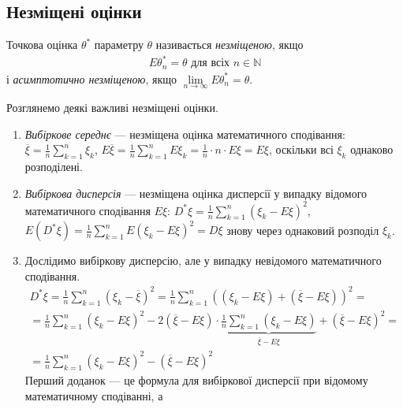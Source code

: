 \subsection{Незміщені оцінки}
 \begin{definition}
    Точкова оцінка $\theta^*$ параметру $\theta$ називається \emph{незміщеною}, якщо
    \begin{gather}\label{estim_unbiased}
        E\theta^*_n = \theta \text{ для всіх } n\in\mathbb{N}
    \end{gather} 
    і \emph{асимптотично незміщеною}, якщо $\underset{n\to\infty}{\lim} E\theta^*_n = \theta$. 
 \end{definition}
 \begin{example} 
    Розглянемо деякі важливі незміщені оцінки.
    \begin{enumerate}
        \item \emph{Вибіркове середнє} --- незміщена оцінка математичного сподівання:
        $\overline{\xi} = \frac{1}{n}\sum\limits_{k=1}^n \xi_k$, $E\overline{\xi} = \frac{1}{n}\sum\limits_{k=1}^n E\xi_k = \frac{1}{n} \cdot{n} \cdot{E\xi} = E\xi$,
        оскільки всі $\xi_k$ однаково розподілені.
        \item \emph{Вибіркова дисперсія} --- незміщена оцінка дисперсії у випадку відомого математичного сподівання $E\xi$:
        $D^*\xi = \frac{1}{n}\sum\limits_{k=1}^n \left(\xi_k - E\xi \right)^2$, 
        $E\left( D^* \xi\right) = \frac{1}{n}\sum\limits_{k=1}^n E\left(\xi_k - E\xi \right)^2 = D\xi$ знову через однаковий розподіл $\xi_k$.
        \item Дослідимо вибіркову дисперсію, але у випадку невідомого математичного сподівання. 
        \begin{gather*}
            D^*\xi = \frac{1}{n}\sum\limits_{k=1}^n \left(\xi_k - \overline{\xi} \right)^2 = 
            \frac{1}{n}\sum\limits_{k=1}^n \left((\xi_k - E\xi) + (\overline{\xi} - E\xi) \right)^2 =  \\
            = \frac{1}{n}\sum\limits_{k=1}^n \left(\xi_k - E\xi \right)^2 - 2\left(\overline{\xi} - E\xi\right)\cdot 
            \underbrace{\frac{1}{n}\sum\limits_{k=1}^n \left(\xi_k - E\xi\right)}_{\overline{\xi} - E\xi} + \left(\overline{\xi} - E\xi\right)^2 = \\
            = \frac{1}{n}\sum\limits_{k=1}^n \left(\xi_k - E\xi \right)^2 - \left(\overline{\xi} - E\xi\right)^2
        \end{gather*}
        Перший доданок --- це формула для вибіркової дисперсії при відомому математичному сподіванні, а 

\end{enumerate}
\end{example}

